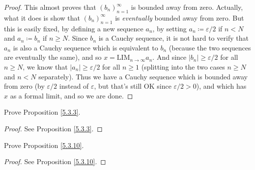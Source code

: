 \begin{proof}
This almost proves that \((b_n)_{n = 1}^{\infty}\) is bounded away from zero.
Actually, what it does is show that \((b_n)_{n = 1}^{\infty}\) is \emph{eventually} bounded away from zero.
But this is easily fixed, by defining a new sequence \(a_n\), by setting \(a_n \coloneqq \varepsilon / 2\) if \(n < N\) and \(a_n \coloneqq b_n\) if \(n \geq N\).
Since \(b_n\) is a Cauchy sequence, it is not hard to verify that \(a_n\) is also a Cauchy sequence which is equivalent to \(b_n\) (because the two sequences are eventually the same), and so \(x = \text{LIM}_{n \to \infty} a_n\).
And since \(|b_n| \geq \varepsilon / 2\) for all \(n \geq N\), we know that \(|a_n| \geq \varepsilon / 2\) for all \(n \geq 1\) (splitting into the two cases \(n \geq N\) and \(n < N\) separately).
Thus we have a Cauchy sequence which is bounded away from zero (by \(\varepsilon / 2\) instead of \(\varepsilon\), but that’s still OK since \(\varepsilon / 2 > 0\)), and which has \(x\) as a formal limit, and so we are done.
\end{proof}

\exercisesection

\begin{exercise}\label{ex 5.3.1}
Prove Proposition \ref{5.3.3}.
\end{exercise}

\begin{proof}
See Proposition \ref{5.3.3}.
\end{proof}

\begin{exercise}\label{ex 5.3.2}
Prove Proposition \ref{5.3.10}.
\end{exercise}

\begin{proof}
See Proposition \ref{5.3.10}.
\end{proof}